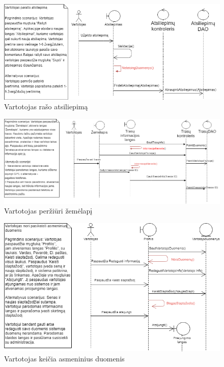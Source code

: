 \documentclass[oneside]{VUMIFPSkursinis}
\begin{document}
			\begin{figure}[h]
    				\centering
    				\includegraphics[width=1\textwidth]{seq12.png}
    				\caption{Vartotojas rašo atsiliepimą}
    				\label{fig:Vartotojas rašo atsiliepimą}
			\end{figure}

			\begin{figure}[h]
    				\centering
    				\includegraphics[width=1\textwidth]{seq13.png}
    				\caption{Vartotojas peržiūri žemėlapį}
    				\label{fig:Vartotojas peržiūri žemėlapį}
			\end{figure}
			
			\begin{figure}[h]
    				\centering
    				\includegraphics[width=1\textwidth]{seq14.png}
    				\caption{Vartotojas keičia asmeninius duomenis}
			\end{figure}
\end{document}
